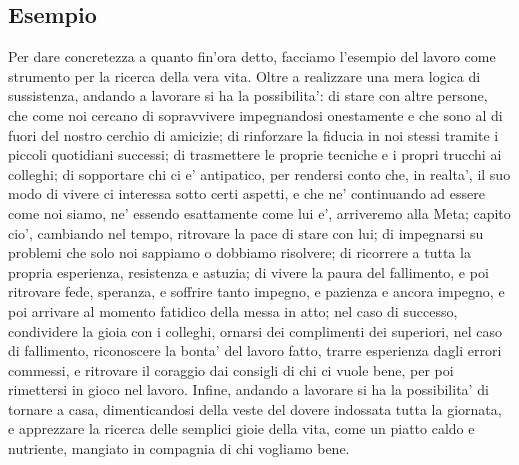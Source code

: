 \subsection{Esempio}
Per dare concretezza a quanto fin'ora detto, facciamo l'esempio del lavoro come strumento per la ricerca della vera vita. Oltre a realizzare una mera logica di sussistenza, andando a lavorare si ha la possibilita': di stare con altre persone, che come noi cercano di sopravvivere impegnandosi onestamente e che sono al di fuori del nostro cerchio di amicizie; di rinforzare la fiducia in noi stessi tramite i piccoli quotidiani successi; di trasmettere le proprie tecniche e i propri trucchi ai colleghi; di sopportare chi ci e' antipatico, per rendersi conto che, in realta', il suo modo di vivere ci interessa sotto certi aspetti, e che ne' continuando ad essere come noi siamo, ne' essendo esattamente come lui e', arriveremo alla Meta; capito cio', cambiando nel tempo, ritrovare la pace di stare con lui; di impegnarsi su problemi che solo noi sappiamo o dobbiamo risolvere; di ricorrere a tutta la propria esperienza, resistenza e astuzia; di vivere la paura del fallimento, e poi ritrovare fede, speranza, e soffrire tanto impegno, e pazienza e ancora impegno, e poi arrivare al momento fatidico della messa in atto; nel caso di successo, condividere la gioia con i colleghi, ornarsi dei complimenti dei superiori, nel caso di fallimento, riconoscere la bonta' del lavoro fatto, trarre esperienza dagli errori commessi, e ritrovare il coraggio dai consigli di chi ci vuole bene, per poi rimettersi in gioco nel lavoro. Infine, andando a lavorare si ha la possibilita' di tornare a casa, dimenticandosi della veste del dovere indossata tutta la giornata, e apprezzare la ricerca delle semplici gioie della vita, come un piatto caldo e nutriente, mangiato in compagnia di chi vogliamo bene.

